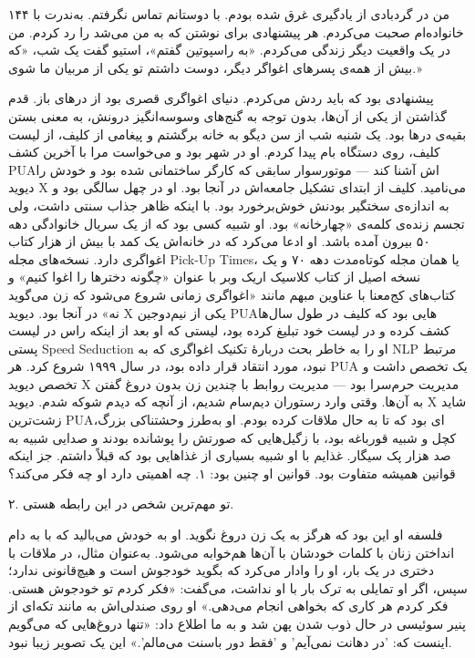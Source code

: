 ۱۴۴  
من در گردبادی از یادگیری غرق شده بودم. با دوستانم تماس نگرفتم. به‌ندرت با خانواده‌ام صحبت می‌کردم. هر پیشنهادی برای نوشتن که به من می‌شد را رد کردم. من در یک واقعیت دیگر زندگی می‌کردم.  
«به راسپوتین گفتم»، استیو گفت یک شب، «که بیش از همه‌ی پسرهای اغواگر دیگر، دوست داشتم تو یکی از مربیان ما شوی.»

پیشنهادی بود که باید ردش می‌کردم. دنیای اغواگری قصری بود از درهای باز. قدم گذاشتن از یکی از آن‌ها، بدون توجه به گنج‌های وسوسه‌انگیز درونش، به معنی بستن بقیه‌ی درها بود.  
یک شنبه شب از سن دیگو به خانه برگشتم و پیغامی از کلیف، از لیست کلیف، روی دستگاه بام پیدا کردم. او در شهر بود و می‌خواست مرا با آخرین کشف PUA‌اش آشنا کند — موتورسوار سابقی که کارگر ساختمانی شده بود و خودش را دیوید X می‌نامید.  
کلیف از ابتدای تشکیل جامعه‌اش در آنجا بود. او در چهل سالگی بود و به اندازه‌ی سختگیر بودنش خوش‌برخورد بود. با اینکه ظاهر جذاب سنتی داشت، ولی تجسم زنده‌ی کلمه‌ی «چهارخانه» بود. او شبیه کسی بود که از یک سریال خانوادگی دهه ۵۰ بیرون آمده باشد. او ادعا می‌کرد که در خانه‌اش یک کمد با بیش از هزار کتاب اغواگری دارد. نسخه‌های مجله Pick-Up Times، یا همان مجله کوتاه‌مدت دهه ۷۰ و یک نسخه اصیل از کتاب کلاسیک اریک وبر با عنوان «چگونه دخترها را اغوا کنیم» و کتاب‌های کج‌معنا با عناوین مبهم مانند «اغواگری زمانی شروع می‌شود که زن می‌گوید نه» در آنجا بود.  
دیوید X یکی از نیم‌دوجین PUA‌هایی بود که کلیف در طول سال‌ها کشف کرده و در لیست خود تبلیغ کرده بود، لیستی که او بعد از اینکه راس در لیست پستی Speed Seduction او را به خاطر بحث درباره‌ٔ تکنیک اغواگری که به NLP مرتبط نبود، مورد انتقاد قرار داده بود، در سال ۱۹۹۹ شروع کرد. هر PUA یک تخصص داشت و تخصص دیوید X مدیریت حرم‌سرا بود — مدیریت روابط با چندین زن بدون دروغ گفتن به آن‌ها.  
وقتی وارد رستوران دیم‌سام شدیم، از آنچه که دیدم شوکه شدم. دیوید X شاید زشت‌ترین PUA‌ای بود که تا به حال ملاقات کرده بودم. او به‌طرز وحشتناکی بزرگ، کچل و شبیه قورباغه بود، با زگیل‌هایی که صورتش را پوشانده بودند و صدایی شبیه به صد هزار پک سیگار.  
غذایم با او شبیه بسیاری از غذاهایی بود که قبلاً داشتم. جز اینکه قوانین همیشه متفاوت بود. قوانین او چنین بود:  
۱. چه اهمیتی دارد او چه فکر می‌کند؟

۲. تو مهم‌ترین شخص در این رابطه هستی.  

فلسفه او این بود که هرگز به یک زن دروغ نگوید. او به خودش می‌بالید که با به دام انداختن زنان با کلمات خودشان با آن‌ها هم‌خوابه می‌شود. به‌عنوان مثال، در ملاقات با دختری در یک بار، او را وادار می‌کرد که بگوید خودجوش است و هیچ‌قانونی ندارد؛ سپس، اگر او تمایلی به ترک بار با او نداشت، می‌گفت: «فکر کردم تو خودجوش هستی. فکر کردم هر کاری که بخواهی انجام می‌دهی.»  
او روی صندلی‌اش به مانند تکه‌ای از پنیر سوئیسی در حال ذوب شدن پهن شد و به ما اطلاع داد: «تنها دروغ‌هایی که می‌گویم اینست که: 'در دهانت نمی‌آیم' و 'فقط دور باسنت می‌مالم'.» این یک تصویر زیبا نبود.  

